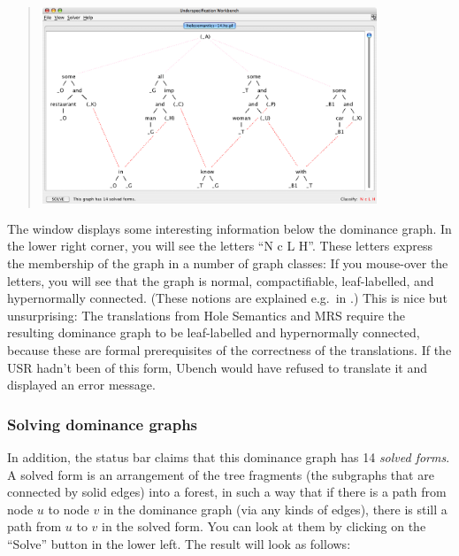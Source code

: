 \begin{quotation}
\includegraphics[width=10cm]{ubench-holesem.png}
\end{quotation}

The window displays some interesting information below the dominance graph. In the lower right corner, you will see the letters ``N c L H''. These letters express the membership of the graph in a number of graph classes: If you mouse-over the letters, you will see that the graph is normal, compactifiable, leaf-labelled, and hypernormally connected. (These notions are explained e.g.\ in .) This is nice but unsurprising: The translations from Hole Semantics and MRS require the resulting dominance graph to be leaf-labelled and hypernormally connected, because these are formal prerequisites of the correctness of the translations. If the USR hadn't been of this form, Ubench would have refused to translate it and displayed an error message.


\subsubsection{Solving dominance graphs}

In addition, the status bar claims that this dominance graph has 14 \emph{solved forms}. A solved form is an arrangement of the tree fragments (the subgraphs that are connected by solid edges) into a forest, in such a way that if there is a path from node $u$ to node $v$ in the dominance graph (via any kinds of edges), there is still a path from $u$ to $v$ in the solved form. You can look at them by clicking on the ``Solve'' button in the lower left. The result will look as follows:



